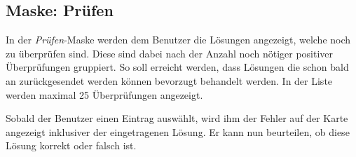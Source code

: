 \subsection{Maske: Prüfen}
In der \emph{Prüfen}-Maske werden dem Benutzer die Lösungen angezeigt, welche noch zu überprüfen sind.
Diese sind dabei nach der Anzahl noch nötiger positiver Überprüfungen gruppiert.
So soll erreicht werden, dass Lösungen die schon bald an  zurückgesendet werden können bevorzugt behandelt werden.
In der Liste werden maximal 25 Überprüfungen angezeigt.

Sobald der Benutzer einen Eintrag auswählt, wird ihm der Fehler auf der Karte angezeigt inklusiver der eingetragenen Lösung.
Er kann nun beurteilen, ob diese Lösung korrekt oder falsch ist.

\begin{figure}[H]
\hfill
{}

\end{figure}
